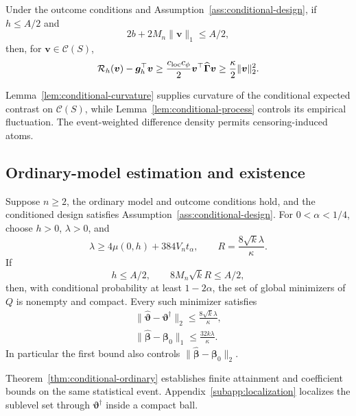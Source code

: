 \begin{lemma}
\label{lem:conditional-curvature}
Under the outcome conditions and Assumption~\ref{ass:conditional-design}, if $h\le A/2$ and
\begin{equation}
 2b+2M_n\|\bm{v}\|_1\le A/2,
 \label{eq:local-radius-vector}
\end{equation}
then, for $\bm{v}\in\mathcal C(S)$,
\begin{equation}
 \mathcal R_h(\bm{v})-\bm{g}_h^\top \bm{v}
 \ge\frac{c_{\rm loc}c_\phi}{2}\bm{v}^\top\widehat{\bm{\Gamma}} \bm{v}
 \ge\frac\kappa2\|\bm{v}\|_2^2.
 \label{eq:local-risk-curvature}
\end{equation}
\end{lemma}
Lemma~\ref{lem:conditional-curvature} supplies curvature of the conditional expected contrast on $\mathcal C(S)$, while Lemma~\ref{lem:conditional-process} controls its empirical fluctuation. The event-weighted difference density permits censoring-induced atoms.

\subsection{Ordinary-model estimation and existence}
\label{subsec:ordinary-theorem}
\begin{theorem}
\label{thm:conditional-ordinary}
Suppose $n\ge2$, the ordinary model and outcome conditions hold, and the conditioned design satisfies Assumption~\ref{ass:conditional-design}. For $0<\alpha<1/4$, choose $h>0$, $\lambda>0$, and
\begin{equation}
 \lambda\ge4\mu(0,h)+384V_nt_\alpha,
 \qquad R=\frac{8\sqrt{k}\lambda}{\kappa}.
 \label{eq:conditional-tuning}
\end{equation}
If
\begin{equation}
 h\le A/2,\qquad 8M_n\sqrt{k}R\le A/2,
 \label{eq:ordinary-locality}
\end{equation}
then, with conditional probability at least $1-2\alpha$, the set of global minimizers of $Q$ is nonempty and compact. Every such minimizer satisfies
\begin{equation}
 \begin{gathered}
\|\widehat{\bm{\vartheta}}-\bm{\vartheta}^\dagger\|_2
       \le\frac{8\sqrt{k}\lambda}{\kappa},\\
 \|\widehat{\bm{\beta}}-\bm{\beta}_0\|_1\le\frac{32k\lambda}{\kappa}.
 \end{gathered}
 \label{eq:conditional-error-bounds}
\end{equation}
In particular the first bound also controls $\|\widehat{\bm{\beta}}-\bm{\beta}_0\|_2$.
\end{theorem}
Theorem~\ref{thm:conditional-ordinary} establishes finite attainment and coefficient bounds on the same statistical event. Appendix~\ref{subapp:localization} localizes the sublevel set through $\bm{\vartheta}^\dagger$ inside a compact ball.

